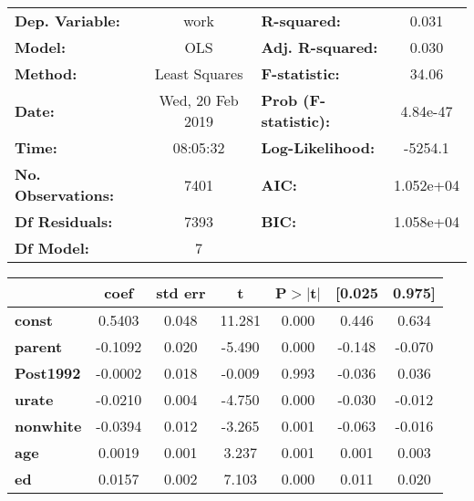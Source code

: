 
\begin{center}
\begin{tabular}{lclc}
\toprule
\textbf{Dep. Variable:}    &       work       & \textbf{  R-squared:         } &     0.031   \\
\textbf{Model:}            &       OLS        & \textbf{  Adj. R-squared:    } &     0.030   \\
\textbf{Method:}           &  Least Squares   & \textbf{  F-statistic:       } &     34.06   \\
\textbf{Date:}             & Wed, 20 Feb 2019 & \textbf{  Prob (F-statistic):} &  4.84e-47   \\
\textbf{Time:}             &     08:05:32     & \textbf{  Log-Likelihood:    } &   -5254.1   \\
\textbf{No. Observations:} &        7401      & \textbf{  AIC:               } & 1.052e+04   \\
\textbf{Df Residuals:}     &        7393      & \textbf{  BIC:               } & 1.058e+04   \\
\textbf{Df Model:}         &           7      & \textbf{                     } &             \\
\bottomrule
\end{tabular}
\begin{tabular}{lcccccc}
                  & \textbf{coef} & \textbf{std err} & \textbf{t} & \textbf{P$>$$|$t$|$} & \textbf{[0.025} & \textbf{0.975]}  \\
\midrule
\textbf{const}    &       0.5403  &        0.048     &    11.281  &         0.000        &        0.446    &        0.634     \\
\textbf{parent}   &      -0.1092  &        0.020     &    -5.490  &         0.000        &       -0.148    &       -0.070     \\
\textbf{Post1992} &      -0.0002  &        0.018     &    -0.009  &         0.993        &       -0.036    &        0.036     \\
\textbf{urate}    &      -0.0210  &        0.004     &    -4.750  &         0.000        &       -0.030    &       -0.012     \\
\textbf{nonwhite} &      -0.0394  &        0.012     &    -3.265  &         0.001        &       -0.063    &       -0.016     \\
\textbf{age}      &       0.0019  &        0.001     &     3.237  &         0.001        &        0.001    &        0.003     \\
\textbf{ed}       &       0.0157  &        0.002     &     7.103  &         0.000        &        0.011    &        0.020     \\

\end{tabular}
\end{center}
